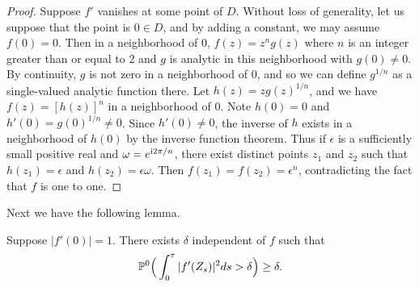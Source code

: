 \begin{proof}
Suppose $f'$ vanishes at some point of $D$. Without loss of generality, let us suppose that the point is $0 \in D$, and by adding a constant, we may assume $f(0) = 0$. Then in a neighborhood of 0, $f(z) = z^ng(z)$ where $n$ is an integer greater than or equal to 2 and $g$ is analytic in this neighborhood with $g(0) \neq 0$. By continuity, $g$ is not zero in a neighborhood of $0$, and so we can define $g^{1/n}$ as a single-valued analytic function there. Let $h(z) = zg(z)^{1/n}$, and we have $f(z) = [h(z)]^n$ in a neighborhood of $0$. Note $h(0) = 0$ and $h'(0) = g(0)^{1/n} \neq 0$. Since $h'(0) \neq 0$, the inverse of $h$ exists in a neighborhood of $h(0)$ by the inverse function theorem. Thus if $\epsilon$ is a sufficiently small positive real and $\omega = e^{\im 2\pi/n}$, there exist distinct points $z_1$ and $z_2$ such that $h(z_1) = \epsilon$ and $h(z_2) = \epsilon\omega$. Then $f(z_1) = f(z_2) = \epsilon^n$, contradicting the fact that $f$ is one to one.
\end{proof}

Next we have the following lemma.

\begin{lemma}\label{lem:ch5_2.5}
Suppose $|f'(0)| = 1$. There exists $\delta$ independent of $f$ such that
\begin{equation}\label{eq:ch5_2.1}
    \P^0\Big(\int_0^{\tau} |f'(Z_s)|^2ds > \delta\Big) \geq \delta.
\end{equation}
\end{lemma}

